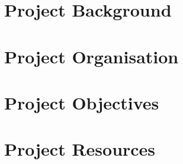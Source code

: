 \documentclass[english]{tauthesis}
\begin{document}


\tableofcontents





\mainmatter

\chapter{Project Background}
\label{ch:project_background}


\chapter{Project Organisation}
\label{ch:project_organisation}


\chapter{Project Objectives}
\label{ch:project_objectives}


\chapter{Project Resources}
\label{ch:project_resources}

\end{document}
